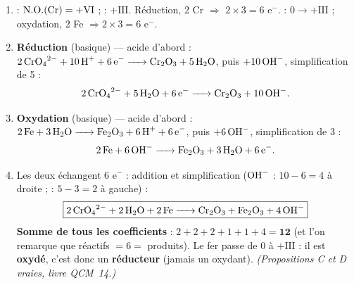 \documentclass[11pt,a4paper]{article}
\newcommand{\NO}{\ensuremath{\mathrm{N.O.}}}
\begin{document}
\begin{corr}
\begin{enumerate}[label=\textbf{\alph*)},leftmargin=2.2em,topsep=2pt,itemsep=2pt]
  \item {} : $\NO(\ce{Cr})=+\mathrm{VI}$ ;  : $+\mathrm{III}$. Réduction, 2 Cr $\Rightarrow$
        $2\times3=6$ e$^-$.  : $0\to+\mathrm{III}$ ; oxydation, 2 Fe $\Rightarrow 2\times3=6$ e$^-$.
  \item \textbf{Réduction} (basique) — acide d'abord :
        $\ce{2 CrO4^{2-} + 10 H+ + 6 e^- -> Cr2O3 + 5 H2O}$, puis $+10\,\ce{OH^-}$, simplification de 5  :
        \[
        \ce{2 CrO4^{2-} + 5 H2O + 6 e^- -> Cr2O3 + 10 OH^-}.
        \]
  \item \textbf{Oxydation} (basique) — acide d'abord :
        $\ce{2 Fe + 3 H2O -> Fe2O3 + 6 H+ + 6 e^-}$, puis $+6\,\ce{OH^-}$, simplification de 3  :
        \[
        \ce{2 Fe + 6 OH^- -> Fe2O3 + 3 H2O + 6 e^-}.
        \]
  \item Les deux échangent 6 e$^-$ : addition et simplification ($\ce{OH^-}$ : $10-6=4$ à droite ;
         : $5-3=2$ à gauche) :
        \[
        \boxed{\ce{2 CrO4^{2-} + 2 H2O + 2 Fe -> Cr2O3 + Fe2O3 + 4 OH^-}}
        \]
        \textbf{Somme de tous les coefficients} : $2+2+2+1+1+4 = \mathbf{12}$ (et l'on remarque que
        réactifs $=6=$ produits). Le fer passe de $0$ à $+\mathrm{III}$ : il est \textbf{oxydé}, c'est donc
        un \textbf{réducteur} (jamais un oxydant). \emph{(Propositions C et D vraies, livre QCM~14.)}
\end{enumerate}
\end{corr}
\end{document}
